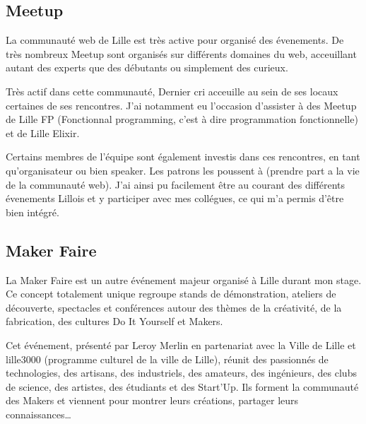 \documentclass[12pt,a4paper]{article}
\begin{document}
  \subsection{Meetup}\label{meetup}

  \bigskip

  La communauté web de Lille est très active pour organisé des évenements.
  De très nombreux Meetup sont organisés sur différents domaines du web,
  acceuillant autant des experts que des débutants ou simplement des
  curieux.

  \bigskip

  Très actif dans cette communauté, Dernier cri acceuille au sein de ses
  locaux certaines de ses rencontres. J'ai notamment eu l'occasion
  d'assister à des Meetup de Lille FP (Fonctionnal programming, c'est à
  dire programmation fonctionnelle) et de Lille Elixir.

  \bigskip

  Certains membres de l'équipe sont également investis dans ces
  rencontres, en tant qu'organisateur ou bien speaker. Les patrons les
  poussent à (prendre part a la vie de la communauté web). J'ai ainsi pu
  facilement être au courant des différents évenements Lillois et y
  participer avec mes collégues, ce qui m'a permis d'être bien intégré.

  \bigskip

  \subsection{Maker Faire}\label{maker-faire}

  \bigskip

  La Maker Faire est un autre événement majeur organisé à Lille durant mon
  stage. Ce concept totalement unique regroupe stands de démonstration,
  ateliers de découverte, spectacles et conférences autour des thèmes de
  la créativité, de la fabrication, des cultures Do It Yourself et Makers.

  \bigskip

  Cet événement, présenté par Leroy Merlin en partenariat avec la Ville de
  Lille et lille3000 (programme culturel de la ville de Lille), réunit des
  passionnés de technologies, des artisans, des industriels, des amateurs,
  des ingénieurs, des clubs de science, des artistes, des étudiants et des
  Start'Up. Ils forment la communauté des Makers et viennent pour montrer
  leurs créations, partager leurs connaissances\ldots{}

  \bigskip
\end{document}
